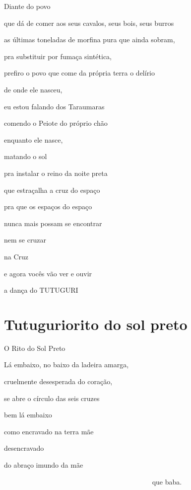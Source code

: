 Diante do povo

que dá de comer aos seus cavalos, seus bois, seus burros

as últimas toneladas de morfina pura que ainda sobram, 

pra substituir por fumaça sintética, 

prefiro o povo que come da própria terra o delírio

de onde ele nasceu,

eu estou falando dos Taraumaras

comendo o Peiote do próprio chão

enquanto ele nasce, 

matando o sol

pra instalar o reino da noite preta

que estraçalha a cruz do espaço

pra que os espaços do espaço

nunca mais possam se encontrar

nem se cruzar

na Cruz

e agora vocês vão ver e ouvir~ \EP[1]

a dança do TUTUGURI


\chapter[Tutugurio rito do sol preto]{Tutugurio\break rito do sol preto}



O Rito do Sol Preto

Lá embaixo, no baixo da ladeira amarga,

cruelmente desesperada do coração,

se abre o círculo das seis cruzes


bem lá embaixo

como encravado na terra mãe

desencravado


do abraço imundo da mãe

~~~~~~~~~~~~~~~~~~~~~~~~~~~~~~~~~~~~~~~~~~ que baba.


